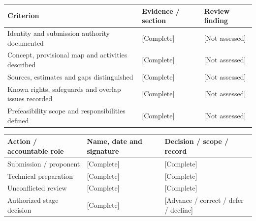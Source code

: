 {\sffamily\fontsize{8.3}{10.3}\selectfont\begin{longtable}{@{}P{80.84mm} P{42.89mm} P{41.24mm}@{}}
\toprule
\textbf{Criterion} & \textbf{Evidence / section} & \textbf{Review finding}\\\midrule\endhead
\rule{0pt}{7.7mm}Identity and submission authority documented & [Complete] & [Not assessed]\\\hline
\rule{0pt}{7.7mm}Concept, provisional map and activities described & [Complete] & [Not assessed]\\\hline
\rule{0pt}{7.7mm}Sources, estimates and gaps distinguished & [Complete] & [Not assessed]\\\hline
\rule{0pt}{7.7mm}Known rights, safeguards and overlap issues recorded & [Complete] & [Not assessed]\\\hline
\rule{0pt}{7.7mm}Prefeasibility scope and responsibilities defined & [Complete] & [Not assessed]\\\hline
\end{longtable}}
{\sffamily\fontsize{8.3}{10.3}\selectfont\begin{longtable}{@{}P{51.14mm} P{56.09mm} P{57.74mm}@{}}
\toprule
\textbf{Action / accountable role} & \textbf{Name, date and signature} & \textbf{Decision / scope / record}\\\midrule\endhead
\rule{0pt}{7.7mm}Submission / proponent & [Complete] & [Complete]\\\hline
\rule{0pt}{7.7mm}Technical preparation & [Complete] & [Complete]\\\hline
\rule{0pt}{7.7mm}Unconflicted review & [Complete] & [Complete]\\\hline
\rule{0pt}{7.7mm}Authorized stage decision & [Complete] & [Advance / correct / defer / decline]\\\hline
\end{longtable}}

